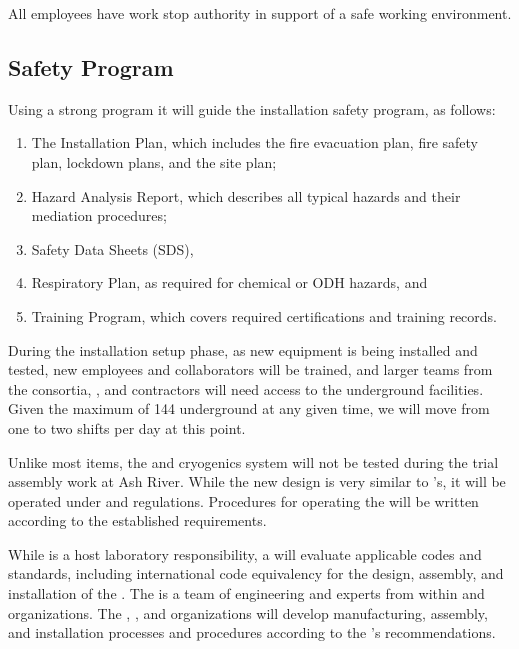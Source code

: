 All employees have work stop authority in support of  a safe working environment. 

\subsection{Safety Program}

Using a strong   program it will guide the  installation safety program, as follows:

\begin{enumerate}
\item	The  Installation  Plan, which includes the fire evacuation plan, fire safety plan, lockdown plans, and the site plan;
\item	Hazard Analysis  Report, which describes all typical hazards and their mediation procedures; 
\item	Safety Data Sheets (SDS), 
\item	Respiratory Plan, as required for chemical or ODH hazards, and 
\item	Training Program, which covers required certifications and  training records.
\end{enumerate}


During the installation setup phase, as new equipment is being installed and tested, new employees and collaborators will be trained, and larger teams from the consortia, ,  and contractors will need access to the underground facilities.  Given the maximum of 144  underground at any given time, we will move from one to two shifts per day at this point. 


Unlike most items, the \coldbox and cryogenics system will not be %
tested during the trial assembly work at Ash River. 
While the new \coldbox design is very similar to 's, it will be operated under  and  regulations.  Procedures for operating the \coldbox will be written according to the established requirements.



While  is  a host laboratory responsibility, a   will evaluate applicable codes and standards, including international code equivalency for the design, assembly, and installation of the  . The  is a team of engineering and  experts from within  and  organizations.  The , , and  organizations will develop manufacturing, assembly, and installation processes and procedures according to the 's recommendations. 

